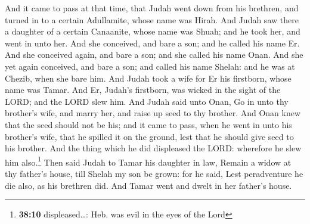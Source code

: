  And it came to pass at that time, that Judah went down
from his brethren, and turned in to a certain Adullamite, whose name was
Hirah.  And Judah saw there a daughter of a certain
Canaanite, whose name was Shuah; and he took her, and went in unto her.
 And she conceived, and bare a son; and he called his name
Er.  And she conceived again, and bare a son; and she
called his name Onan.  And she yet again conceived, and
bare a son; and called his name Shelah: and he was at Chezib, when she
bare him.  And Judah took a wife for Er his firstborn,
whose name was Tamar.  And Er, Judah's firstborn, was
wicked in the sight of the LORD; and the LORD slew him. 
And Judah said unto Onan, Go in unto thy brother's wife, and marry her,
and raise up seed to thy brother.  And Onan knew that the
seed should not be his; and it came to pass, when he went in unto his
brother's wife, that he spilled it on the ground, lest that he should
give seed to his brother.  And the thing which he did
displeased the LORD: wherefore he slew him also.\footnote{\textbf{38:10}
  displeased\ldots: Heb. was evil in the eyes of the Lord}
 Then said Judah to Tamar his daughter in law, Remain a
widow at thy father's house, till Shelah my son be grown: for he said,
Lest peradventure he die also, as his brethren did. And Tamar went and
dwelt in her father's house.

